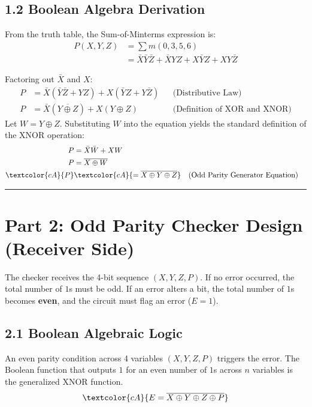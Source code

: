 \documentclass[12pt,a3paper]{article}
\begin{document}
\begin{enumerate}
\begin{tcolorbox}[enhanced,breakable,ansbox,colback=cA!4,colframe=cA,boxrule=0.8pt,arc=5pt,title={\textbf{Answer}},fonttitle=\bfseries\color{white},colbacktitle=cA]
\subsection*{1.2 Boolean Algebra Derivation}
From the truth table, the Sum-of-Minterms expression is:
\begin{align*}
    P(X, Y, Z) &= \sum m(0, 3, 5, 6) \\
    &= \bar{X}\bar{Y}\bar{Z} + \bar{X}YZ + X\bar{Y}Z + XY\bar{Z}
\end{align*}

Factoring out $\bar{X}$ and $X$:
\begin{align*}
    P &= \bar{X}(\bar{Y}\bar{Z} + YZ) + X(\bar{Y}Z + Y\bar{Z}) && \text{(Distributive Law)} \\
    P &= \bar{X}(\overline{Y \oplus Z}) + X(Y \oplus Z) && \text{(Definition of XOR and XNOR)}
\end{align*}
Let $W = Y \oplus Z$. Substituting $W$ into the equation yields the standard definition of the XNOR operation:
\begin{align*}
    P &= \bar{X}\bar{W} + XW \\
    P &= \overline{X \oplus W} \\
    \textcolor{cA}{P} &\textcolor{cA}{= \overline{X \oplus Y \oplus Z}} && \text{(Odd Parity Generator Equation)}
\end{align*}

\vspace{0.2cm}
\hrule
\vspace{0.4cm}

\section*{Part 2: Odd Parity Checker Design (Receiver Side)}

The checker receives the 4-bit sequence $(X, Y, Z, P)$. If no error occurred, the total number of $1$s must be odd. If an error alters a bit, the total number of $1$s becomes \textbf{even}, and the circuit must flag an error ($E = 1$). 

\subsection*{2.1 Boolean Algebraic Logic}
An even parity condition across 4 variables $(X, Y, Z, P)$ triggers the error. The Boolean function that outputs $1$ for an even number of $1$s across $n$ variables is the generalized XNOR function. 
\begin{equation}
    \textcolor{cA}{E = \overline{X \oplus Y \oplus Z \oplus P}}
\end{equation}


\end{tcolorbox}
\end{enumerate}
\end{document}

